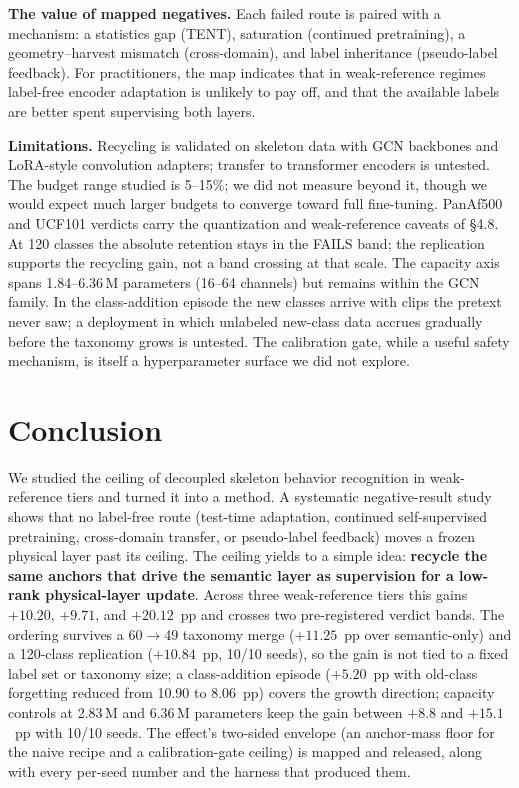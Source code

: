 \documentclass[preprint,12pt,number]{elsarticle}
\begin{document}
\textbf{The value of mapped negatives.} Each failed route is paired with a
mechanism: a statistics gap (TENT), saturation (continued pretraining), a
geometry--harvest mismatch (cross-domain), and label inheritance
(pseudo-label feedback). For
practitioners, the map indicates that in weak-reference regimes label-free
encoder adaptation is unlikely to pay off, and that the available labels are
better spent supervising both layers.

\textbf{Limitations.} Recycling is validated on skeleton data with GCN backbones
and LoRA-style convolution adapters; transfer to transformer encoders is
untested. The budget range studied is 5--15\%; we did not measure beyond it,
though we would expect much larger budgets to converge toward full
fine-tuning. PanAf500 and UCF101 verdicts carry the quantization
and weak-reference caveats of \S4.8. At 120 classes the absolute retention
stays in the FAILS band; the replication supports the recycling gain, not a
band crossing at that scale. The capacity axis spans 1.84--6.36\,M parameters
(16--64 channels) but remains within the GCN family. In the class-addition
episode the new classes arrive with clips the pretext never saw; a deployment
in which unlabeled new-class data accrues gradually before the taxonomy grows
is untested. The calibration gate, while a useful
safety mechanism, is itself a hyperparameter surface we did not explore.

\section{Conclusion}

We studied the ceiling of decoupled skeleton behavior recognition in
weak-reference tiers and turned it into a method. A systematic negative-result
study shows that no label-free route (test-time adaptation, continued
self-supervised pretraining, cross-domain transfer, or pseudo-label feedback)
moves a frozen physical layer past its ceiling. The ceiling yields to a
simple idea: \textbf{recycle the same anchors that
drive the semantic layer as supervision for a low-rank physical-layer
update}. Across three weak-reference tiers this gains $+10.20$, $+9.71$, and
$+20.12$~pp and crosses two pre-registered verdict bands. The ordering
survives a 60$\rightarrow$49 taxonomy merge ($+11.25$~pp over semantic-only)
and a 120-class replication ($+10.84$~pp, 10/10 seeds), so the gain is not
tied to a fixed label set or taxonomy size; a class-addition episode
($+5.20$~pp with old-class forgetting reduced from 10.90 to 8.06~pp) covers
the growth direction; capacity controls at 2.83\,M and
6.36\,M parameters keep the gain between $+8.8$ and $+15.1$~pp with 10/10
seeds. The effect's
two-sided envelope (an anchor-mass floor for the naive recipe and a
calibration-gate ceiling) is mapped and released, along with every per-seed
number and the harness that produced them.
\end{document}
